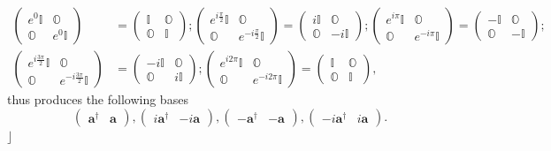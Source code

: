 \documentclass[aps, preprint]{revtex4}
\begin{document}
\begin{align}\left (\begin{array}{cc}e^{0} \mathbb{I} & \mathbb{O} \\
\mathbb{O} & e^{0} \mathbb{I}\end{array}\right ) &  =\left (\begin{array}{cc}\mathbb{I} & \mathbb{O} \\
\mathbb{O} & \mathbb{I}\end{array}\right ) ;\left (\begin{array}{cc}e^{i \frac{\pi }{2}} \mathbb{I} & \mathbb{O} \\
\mathbb{O} & e^{ -i \frac{\pi }{2}} \mathbb{I}\end{array}\right ) =\left (\begin{array}{cc}i \mathbb{I} & \mathbb{O} \\
\mathbb{O} &  -i \mathbb{I}\end{array}\right ) ;\left (\begin{array}{cc}e^{i \pi } \mathbb{I} & \mathbb{O} \\
\mathbb{O} & e^{ -i \pi } \mathbb{I}\end{array}\right ) =\left (\begin{array}{cc} -\mathbb{I} & \mathbb{O} \\
\mathbb{O} &  -\mathbb{I}\end{array}\right ) ; \\
\left (\begin{array}{cc}e^{i \frac{3 \pi }{2}} \mathbb{I} & \mathbb{O} \\
\mathbb{O} & e^{ -i \frac{3 \pi }{2}} \mathbb{I}\end{array}\right ) &  =\left (\begin{array}{cc} -i \mathbb{I} & \mathbb{O} \\
\mathbb{O} & i \mathbb{I}\end{array}\right ) ;\left (\begin{array}{cc}e^{i 2 \pi } \mathbb{I} & \mathbb{O} \\
\mathbb{O} & e^{ -i 2 \pi } \mathbb{I}\end{array}\right ) =\left (\begin{array}{cc}\mathbb{I} & \mathbb{O} \\
\mathbb{O} & \mathbb{I}\end{array}\right )\text{,}\end{align}thus produces the following bases
\begin{equation}\left (\begin{array}{cc}\mathbf{a}^{ \dag } & \mathbf{a}\end{array}\right ) ,\left (\begin{array}{cc}i \mathbf{a}^{ \dag } &  -i \mathbf{a}\end{array}\right ) ,\left (\begin{array}{cc} -\mathbf{a}^{ \dag } &  -\mathbf{a}\end{array}\right ) ,\left (\begin{array}{cc} -i \mathbf{a}^{ \dag } & i \mathbf{a}\end{array}\right )\text{.}
\end{equation}$\rfloor $ 
\end{document}
